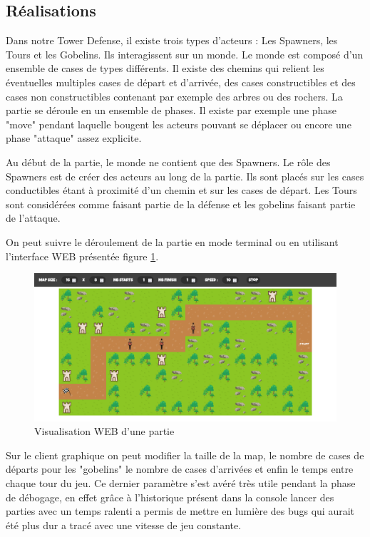 \documentclass[french]{article}
\begin{document}
\subsection{Réalisations}


Dans notre Tower Defense, il existe trois types d'acteurs : Les Spawners, les Tours et les Gobelins. Ils interagissent sur un monde.
Le monde est composé d'un ensemble de cases de types différents. Il existe des chemins qui relient les éventuelles multiples cases de départ et d'arrivée, des cases constructibles et des cases non constructibles contenant par exemple des arbres ou des rochers.
La partie se déroule en un ensemble de phases. Il existe par exemple une phase "move" pendant laquelle bougent les acteurs pouvant se déplacer ou encore une phase "attaque" assez explicite.

Au début de la partie, le monde ne contient que des Spawners. Le rôle des Spawners est de créer des acteurs au long de la partie. Ils sont placés sur les cases conductibles étant à proximité d'un chemin et sur les cases de départ.
Les Tours sont considérées comme faisant partie de la défense et les gobelins faisant partie de l'attaque.

On peut suivre le déroulement de la partie en mode terminal ou en utilisant l'interface WEB présentée figure \ref{fig:visualisation}.

\begin{figure}[H]
    \centering
    \includegraphics[width=\textwidth]{TowerDefense.png}
    \caption{Visualisation WEB d'une partie}
    \label{fig:visualisation}
\end{figure}
Sur le client graphique on peut modifier la taille de la map, le nombre de cases de départs pour les "gobelins" le nombre de cases d'arrivées et enfin le temps entre chaque tour du jeu. Ce dernier paramètre s'est avéré très utile pendant la phase de débogage, en effet grâce à l'historique présent dans la console lancer des parties avec un temps ralenti a permis de mettre en lumière des bugs qui aurait été plus dur a tracé avec une vitesse de jeu constante. 
\end{document}
